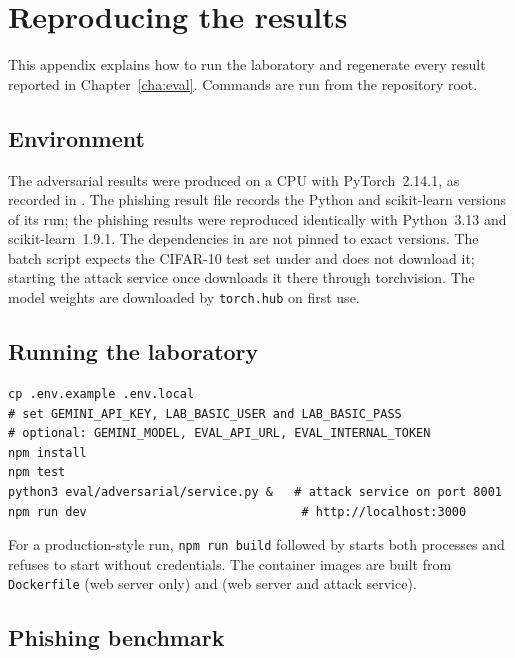 \chapter{Reproducing the results}
\label{app:eval}

This appendix explains how to run the laboratory and regenerate every result reported in Chapter~\ref{cha:eval}. Commands are run from the repository root.

\section{Environment}
\label{sec:run-env}

The adversarial results were produced on a CPU with PyTorch~2.14.1, as recorded in . The phishing result file records the Python and scikit-learn versions of its run; the phishing results were reproduced identically with Python~3.13 and scikit-learn~1.9.1. The dependencies in  are not pinned to exact versions. The batch script expects the CIFAR-10 test set under  and does not download it; starting the attack service once downloads it there through torchvision. The model weights are downloaded by \texttt{torch.hub} on first use.

\section{Running the laboratory}
\label{sec:run-web}

\begin{lstlisting}
cp .env.example .env.local
# set GEMINI_API_KEY, LAB_BASIC_USER and LAB_BASIC_PASS
# optional: GEMINI_MODEL, EVAL_API_URL, EVAL_INTERNAL_TOKEN
npm install
npm test
python3 eval/adversarial/service.py &   # attack service on port 8001
npm run dev                              # http://localhost:3000
\end{lstlisting}

For a production-style run, \texttt{npm run build} followed by  starts both processes and refuses to start without credentials. The container images are built from \texttt{Dockerfile} (web server only) and  (web server and attack service).

\section{Phishing benchmark}
\label{sec:run-phish}


